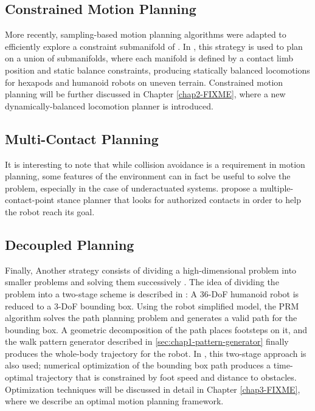 \subsection{Constrained Motion Planning}
\label{subsec:chap1-constrained-motion-planning}

More recently, sampling-based motion planning algorithms were adapted
to efficiently explore a constraint submanifold of \cspace. In
\cite{bret06, haus10}, this strategy is used to plan on a union of
submanifolds, where each manifold is defined by a contact limb
position and static balance constraints, producing statically balanced
locomotions for hexapods and humanoid robots on uneven
terrain. Constrained motion planning will be further discussed in
Chapter \ref{chap2-FIXME}, where a new dynamically-balanced locomotion
planner is introduced.

\subsection{Multi-Contact Planning}
\label{subsec-chap1-multi-contact-planning}

It is interesting to note that while collision avoidance is a
requirement in motion planning, some features of the environment can
in fact be useful to solve the problem, especially in the case of
underactuated systems. \cite{esca06, bouy12} propose a
multiple-contact-point stance planner that looks for authorized
contacts in order to help the robot reach its goal.

\subsection{Decoupled Planning}
\label{subsec:chap1-bounding-box}

Finally, Another strategy consists of dividing a high-dimensional
problem into smaller problems and solving them successively
\cite{zhan09}. The idea of dividing the problem into a two-stage
scheme is described in \cite{yosh08}: A 36-DoF humanoid robot is
reduced to a 3-DoF bounding box. Using the robot simplified model, the
PRM algorithm solves the path planning problem and generates a valid
path for the bounding box. A geometric decomposition of the path
places footsteps on it, and the walk pattern generator described in
\ref{sec:chap1-pattern-generator} finally produces the whole-body
trajectory for the robot. In \cite{moul10}, this two-stage approach is
also used; numerical optimization of the bounding box path produces a
time-optimal trajectory that is constrained by foot speed and distance
to obstacles. Optimization techniques will be discussed in detail in
Chapter \ref{chap3-FIXME}, where we describe an optimal motion
planning framework.

